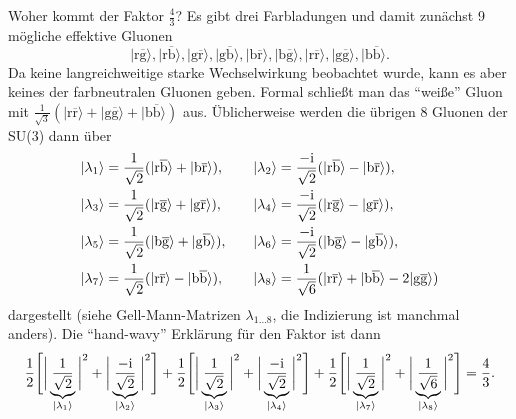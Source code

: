 \begin{fquestion}{Woher kommt der Faktor $\frac{4}{3}$?}
    Es gibt drei Farbladungen und damit zunächst 9 mögliche effektive Gluonen
    $$|\mathrm{r}\overline{\mathrm{g}}\rangle, |\mathrm{r}\overline{\mathrm{b}}\rangle, |\mathrm{g}\overline{\mathrm{r}}\rangle, |\mathrm{g}\overline{\mathrm{b}}\rangle, |\mathrm{b}\overline{\mathrm{r}}\rangle, |\mathrm{b}\overline{\mathrm{g}}\rangle,
    |\mathrm{r}\overline{\mathrm{r}}\rangle,
    |\mathrm{g}\overline{\mathrm{g}}\rangle,
    |\mathrm{b}\overline{\mathrm{b}}\rangle.$$
    Da keine langreichweitige starke Wechselwirkung beobachtet wurde, kann es aber keines der farbneutralen Gluonen geben.
    Formal schließt man das ``weiße'' Gluon mit $\frac{1}{\sqrt{3}} (|\mathrm{r}\overline{\mathrm{r}}\rangle + |\mathrm{g}\overline{\mathrm{g}}\rangle + |\mathrm{b}\overline{\mathrm{b}}\rangle)$ aus.
    Üblicherweise werden die übrigen 8 Gluonen der SU(3) dann über 
    $$\begin{aligned} |\lambda_1\rangle &= \frac{1}{\sqrt{2}} (|\mathrm{r}\overline{\mathrm{b}}\rangle + |\mathrm{b}\overline{\mathrm{r}}\rangle ),&&&
    |\lambda_2\rangle &= \frac{-\text{i}}{\sqrt{2}} (|\mathrm{r}\overline{\mathrm{b}}\rangle - |\mathrm{b}\overline{\mathrm{r}}\rangle ),\\
    |\lambda_3\rangle &= \frac{1}{\sqrt{2}} (|\mathrm{r}\overline{\mathrm{g}}\rangle + |\mathrm{g}\overline{\mathrm{r}}\rangle ),&&&
    |\lambda_4\rangle &= \frac{-\text{i}}{\sqrt{2}} (|\mathrm{r}\overline{\mathrm{g}}\rangle - |\mathrm{g}\overline{\mathrm{r}}\rangle ),\\
    |\lambda_5\rangle &= \frac{1}{\sqrt{2}} (|\mathrm{b}\overline{\mathrm{g}}\rangle + |\mathrm{g}\overline{\mathrm{b}}\rangle ), &&&
    |\lambda_6\rangle &= \frac{-\text{i}}{\sqrt{2}} (|\mathrm{b}\overline{\mathrm{g}}\rangle - |\mathrm{g}\overline{\mathrm{b}}\rangle ),\\
    |\lambda_7\rangle &= \frac{1}{\sqrt{2}} (|\mathrm{r}\overline{\mathrm{r}}\rangle - |\mathrm{b}\overline{\mathrm{b}}\rangle ),&&&
    |\lambda_8\rangle &= \frac{1}{\sqrt{6}} (|\mathrm{r}\overline{\mathrm{r}}\rangle +  |\mathrm{b}\overline{\mathrm{b}}\rangle - 2|\mathrm{g}\overline{\mathrm{g}}\rangle ) \end{aligned}$$
    dargestellt (siehe Gell-Mann-Matrizen $\lambda_{1\dots 8}$, die Indizierung ist manchmal anders). 
    Die ``hand-wavy'' Erklärung für den Faktor ist dann 
    $$\frac{1}{2} \Bigg[ \bigg\vert \underbrace{\frac{1}{\sqrt{2}}}_{|\lambda_1\rangle} \bigg\vert^2 + \bigg\vert \underbrace{\frac{-\text{i}}{\sqrt{2}}}_{|\lambda_2\rangle} \bigg\vert^2 \Bigg] + \frac{1}{2} \Bigg[ \bigg\vert \underbrace{\frac{1}{\sqrt{2}}}_{|\lambda_3\rangle} \bigg\vert^2 + \bigg\vert \underbrace{\frac{-\text{i}}{\sqrt{2}}}_{|\lambda_4\rangle} \bigg\vert^2 \Bigg] + \frac{1}{2} \Bigg[ \bigg\vert \underbrace{\frac{1}{\sqrt{2}}}_{|\lambda_7\rangle} \bigg\vert^2 + \bigg\vert \underbrace{\frac{1}{\sqrt{6}}}_{|\lambda_8\rangle} \bigg\vert^2 \Bigg] = \frac{4}{3}. $$

\end{fquestion}
